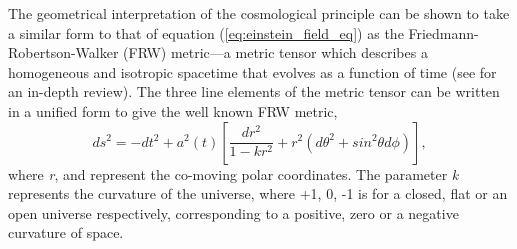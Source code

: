 The geometrical interpretation of the cosmological principle can be shown to take a similar form to that of equation (\ref{eq:einstein_field_eq}) as the Friedmann-Robertson-Walker (FRW) metric---a metric tensor which describes a homogeneous and isotropic spacetime that evolves as a function of time (see \cite{Modern_Cosmology, Gravity} for an in-depth review). The three line elements of the metric tensor can be written in a unified form to give the well known FRW metric,
%
\begin{equation}
  ds^2 = -dt^2 + a^2(t) \left[ \frac{dr^2}{1 - kr^2} +r^2(d\theta^2 + sin^2\theta d\phi) \right],
\end{equation}
%
where \textit{r}, \theta and \phi represent the co-moving polar coordinates. The parameter \textit{k} represents the curvature of the universe, where +1, 0, -1 is for a closed, flat or an open universe respectively, corresponding to a positive, zero or a negative curvature of space.

